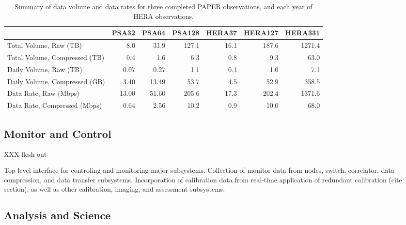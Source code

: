 \documentclass[preprint]{aastex}
\begin{document}
%
%

\begin{table}
\begin{tabular}{| l | r r r r r r |}
    \hline
                                      & PSA32 & PSA64 & PSA128 & HERA37 & HERA127 & HERA331 \\ \hline
               Total Volume, Raw (TB) &   8.0 &  31.9 &  127.1 &   16.1 &   187.6 &  1271.4 \\
        Total Volume, Compressed (TB) &   0.4 &   1.6 &    6.3 &    0.8 &     9.3 &    63.0 \\
               Daily Volume, Raw (TB) &  0.07 &  0.27 &    1.1 &    0.1 &     1.0 &     7.1 \\
        Daily Volume, Compressed (GB) &  3.40 & 13.49 &   53.7 &    4.5 &    52.9 &   358.5 \\
                Data Rate, Raw (Mbps) & 13.00 & 51.60 &  205.6 &   17.3 &   202.4 &  1371.6 \\
         Data Rate, Compressed (Mbps) &  0.64 &  2.56 &   10.2 &    0.9 &    10.0 &    68.0 \\
    \hline
\end{tabular}
\caption{\label{tab:data_vol} Summary of data volume and data rates for three completed PAPER observations, and each year of HERA observations.}
\end{table}

\subsection{Monitor and Control}

XXX flesh out

Top-level interface for controling and monitoring major subsystems. 
Collection of monitor data from nodes, switch, correlator, data compression, and data transfer subsystems.
Incorporation of calibration data from real-time application of redundant calibration (cite section), as well as
other calibration, imaging, and assessment subsystems.

\subsection{Analysis and Science}
\end{document}
